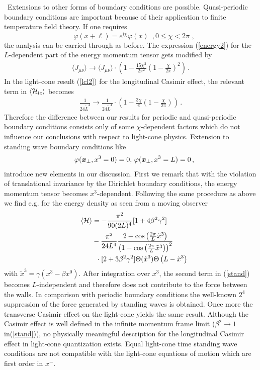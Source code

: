 \documentclass[a4paper,twocolumn,eqsecnum,aps]{revtex4}
\begin{document}
\vskip 0.2cm
\, Extensions to other forms of boundary conditions are possible. Quasi-periodic boundary conditions are important because of their application to finite temperature field theory. If one requires
\begin{equation}
  \quad \varphi (x+\ell) = e^{i\chi}\varphi (x) \,\,\,,0\leq \chi < 2\pi \,\,,
\end{equation}
the analysis can be carried through as before. The expression (\ref{energy2}) for the $L$-dependent part of the energy momentum tensor gets modified by
\begin{align}
\langle J_{\mu\nu}\rangle \rightarrow \langle J_{\mu\nu}\rangle\cdot \left(1-\frac{15\chi^2}{2\pi^2}\left(1-\frac{\chi}{2\pi}\right)^2\right) \, .
\end{align}
In the light-cone result (\ref{lcl2}) for the longitudinal Casimir effect, the relevant term in $\langle {\cal H}_{lc} \rangle$ becomes
\begin{align}
\frac{1}{24 \tilde{L}^4} \rightarrow \frac{1}{24 \tilde{L}^4} \cdot \left(1-\frac{3\chi}{\pi}\left(1-\frac{\chi}{2\pi}\right)\right) \, .
\end{align}
Therefore the difference between our results for periodic and quasi-periodic boundary conditions consists only of some $\chi$-dependent factors which do not influence our conclusions with respect to light-cone physics. 
Extension to standing wave boundary conditions like
\begin{align}
\quad \varphi(\mbox{\boldmath$x$}_{\perp},x^3=0)=0, \, \varphi(\mbox{\boldmath$x$}_{\perp},x^3=L)=0\,,
\end{align}
introduce new elements in our discussion. First we remark that with the violation of translational invariance by the Dirichlet boundary conditions, the energy momentum tensor becomes $x^3$-dependent. Following the same procedure as above we find e.g. for the energy density as seen from a moving observer
\begin{align}
\label{stand}
\quad \langle {\cal H}\rangle  &= -\frac{\pi^2}{90(2L)^4} [1+4\beta^2\gamma^2] \nonumber\\
&- \frac{\pi^2}{24 L^4} \frac{2+\cos\left(\frac{2\pi}{L}\tilde{x}^3\right)}{\left(1-\cos\left(\frac{2\pi}{L}\tilde{x}^3\right)\right)^2} \nonumber\\
&\;\;\cdot[2+3\beta^2\gamma^2] \Theta(\tilde{x}^3)\Theta\left(L-\tilde{x}^3\right)
\end{align}
with $ \tilde{x}^3=\gamma(x^3-\beta x^0)$. 
After integration over $x^3$, the second term in (\ref{stand}) becomes $L$-independent and therefore does not contribute to the force between the walls. In comparison with periodic boundary conditions the well-known $2^4$ suppression of the force generated by standing waves is obtained. Once more the transverse Casimir effect on the light-cone yields the same result. Although the Casimir effect is well defined in the infinite momentum frame limit ($\beta^2 \rightarrow 1$ in(\ref{stand})), no physically meaningful description for the longitudinal Casimir effect in light-cone quantization exists. Equal light-cone time standing wave conditions are not compatible with the light-cone equations of motion which are first order in $x^-$.
\end{document}
